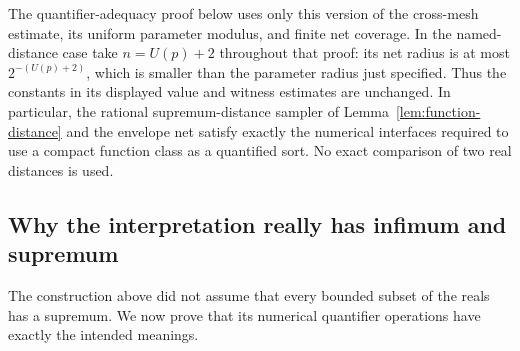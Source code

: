 The quantifier-adequacy proof below uses only this version of the
cross-mesh estimate, its uniform parameter modulus, and finite net
coverage. In the named-distance case take $n=U(p)+2$ throughout
that proof: its net radius is at most $2^{-(U(p)+2)}$, which is
smaller than the parameter radius just specified. Thus the constants
in its displayed value and witness estimates are unchanged.
In particular, the rational supremum-distance sampler of
Lemma~\ref{lem:function-distance} and the envelope net satisfy exactly
the numerical interfaces required to use a compact function class as
a quantified sort. No exact comparison of two real distances is used.

\subsection{Why the interpretation really has infimum and supremum}
\label{subsec:cm-quantifier-adequacy}

The construction above did not assume that every bounded subset of the
reals has a supremum. We now prove that its numerical quantifier
operations have exactly the intended meanings.

